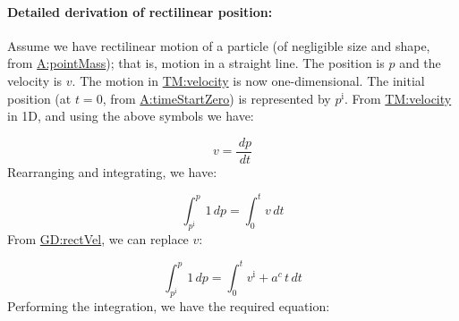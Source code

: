 \documentclass[12pt]{article}
\begin{document}
\paragraph{Detailed derivation of rectilinear position:}
\label{GD:rectPosDeriv}
Assume we have rectilinear motion of a particle (of negligible size and shape, from \hyperref[pointMass]{A:pointMass}); that is, motion in a straight line. The position is $p$ and the velocity is $v$. The motion in \hyperref[TM:velocity]{TM:velocity} is now one-dimensional. The initial position (at $t=0$, from \hyperref[timeStartZero]{A:timeStartZero}) is represented by ${p^{\text{i}}}$. From \hyperref[TM:velocity]{TM:velocity} in 1D, and using the above symbols we have:

\begin{displaymath}
v=\frac{\,dp}{\,dt}
\end{displaymath}
Rearranging and integrating, we have:

\begin{displaymath}
\int_{{p^{\text{i}}}}^{p}{1}\,dp=\int_{0}^{t}{v}\,dt
\end{displaymath}
From \hyperref[GD:rectVel]{GD:rectVel}, we can replace $v$:

\begin{displaymath}
\int_{{p^{\text{i}}}}^{p}{1}\,dp=\int_{0}^{t}{{v^{\text{i}}}+{a^{c}}\,t}\,dt
\end{displaymath}
Performing the integration, we have the required equation:
\end{document}
